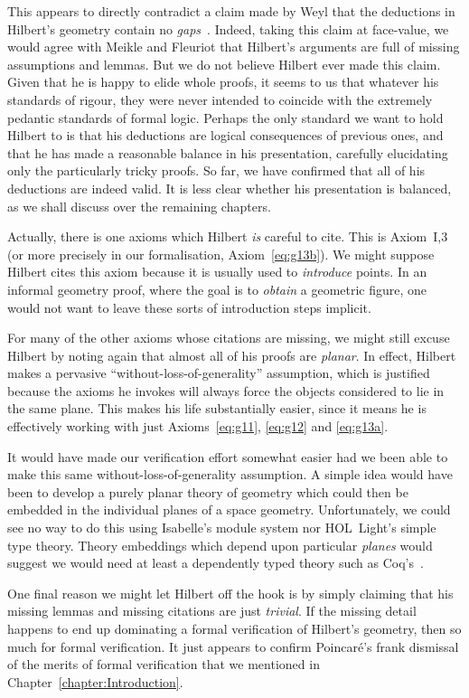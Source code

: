 This appears to directly contradict a claim made by Weyl that the deductions in Hilbert's geometry contain no \emph{gaps}~\cite{TableChairMug}. Indeed, taking this claim at face-value, we would agree with Meikle and Fleuriot that Hilbert's arguments are full of missing assumptions and lemmas. But we do not believe Hilbert ever made this claim. Given that he is happy to elide whole proofs, it seems to us that whatever his standards of rigour, they were never intended to coincide with the extremely pedantic standards of formal logic. Perhaps the only standard we want to hold Hilbert to is that his deductions are logical consequences of previous ones, and that he has made a reasonable balance in his presentation, carefully elucidating only the particularly tricky proofs. So far, we have confirmed that all of his deductions are indeed valid. It is less clear whether his presentation is balanced, as we shall discuss over the remaining chapters.

Actually, there is one axioms which Hilbert \emph{is} careful to cite. This is Axiom~I,3 (or more precisely in our formalisation, Axiom~\ref{eq:g13b}). We might suppose Hilbert cites this axiom because it is usually used to \emph{introduce} points. In an informal geometry proof, where the goal is to \emph{obtain} a geometric figure, one would not want to leave these sorts of introduction steps implicit. 

For many of the other axioms whose citations are missing, we might still excuse Hilbert by noting again that almost all of his proofs are \emph{planar}. In effect, Hilbert makes a pervasive ``without-loss-of-generality'' assumption, which is justified because the axioms he invokes will always force the objects considered to lie in the same plane. This makes his life substantially easier, since it means he is effectively working with just Axioms~\ref{eq:g11}, \ref{eq:g12} and \ref{eq:g13a}. 

It would have made our verification effort somewhat easier had we been able to make this same without-loss-of-generality assumption. A simple idea would have been to develop a purely planar theory of geometry which could then be embedded in the individual planes of a space geometry. Unfortunately, we could see no way to do this using Isabelle's module system nor HOL~Light's simple type theory. Theory embeddings which depend upon particular \emph{planes} would suggest we would need at least a dependently typed theory such as Coq's~\cite{Coq}.

One final reason we might let Hilbert off the hook is by simply claiming that his missing lemmas and missing citations are just \emph{trivial}. If the missing detail happens to end up dominating a formal verification of Hilbert's geometry, then so much for formal verification. It just appears to confirm Poincar\'{e}'s frank dismissal of the merits of formal verification that we mentioned in Chapter~\ref{chapter:Introduction}. 

